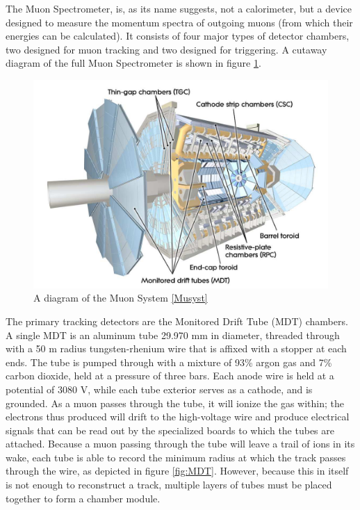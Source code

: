 The Muon Spectrometer, is, as its name suggests, not a calorimeter, but a device designed to measure the momentum spectra of outgoing muons (from which their energies can be calculated). It consists of four major types of detector chambers, two designed for muon tracking and two designed for triggering. A cutaway diagram of the full Muon Spectrometer is shown in figure \ref{fig:MuSyst}.

\begin{figure}
  \includegraphics[width=\linewidth]{figures/detector_chapter/MuSyst.png}
  \caption{A diagram of the Muon System \ref{Musyst}}
  \label{fig:MuSyst}
\end{figure}

The primary tracking detectors are the Monitored Drift Tube (MDT) chambers. A single MDT is an aluminum tube 29.970 mm in diameter, threaded through with a 50 \mu m radius tungsten-rhenium wire that is affixed with a stopper at each ends. The tube is pumped through with a mixture of 93\% argon gas and 7\% carbon dioxide, held at a pressure of three bars. Each anode wire is held at a potential of 3080 V, while each tube exterior serves as a cathode, and is grounded. As a muon passes through the tube, it will ionize the gas within; the electrons thus produced will drift to the high-voltage wire and produce electrical signals that can be read out by the specialized boards to which the tubes are attached. Because a muon passing through the tube will leave a trail of ions in its wake, each tube is able to record the minimum radius at which the track passes through the wire, as depicted in figure \ref{fig:MDT}. However, because this in itself is not enough to reconstruct a track, multiple layers of tubes must be placed together to form a chamber module.

